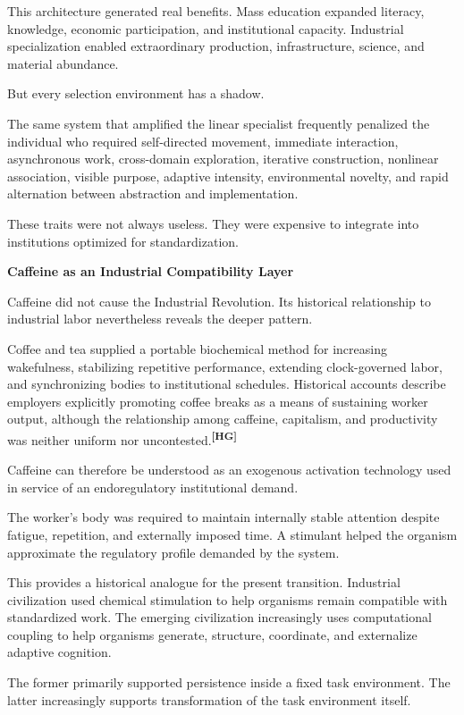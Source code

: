 \documentclass[10pt]{article}
\newcommand{\ActiveAccent}{Industrial}
\newcommand{\papersection}[2]{%
  \Needspace{8\baselineskip}
  \vspace{1.1em}
  \noindent\begin{minipage}[t]{0.12\textwidth}
    \vspace{1pt}{\sffamily\bfseries\fontsize{17}{17}\selectfont\textcolor{\ActiveAccent}{#1}}
  \end{minipage}%
  \begin{minipage}[t]{0.86\textwidth}
    {\sffamily\bfseries\fontsize{16.2}{19}\selectfont #2}\par
    \vspace{0.35em}{\color{\ActiveAccent}\rule{\linewidth}{1.15pt}}
  \end{minipage}
  \vspace{0.55em}
}
\newcommand{\sourcecue}[1]{\textsuperscript{\sffamily\bfseries\fontsize{6.5}{7}\selectfont\textcolor{\ActiveAccent}{[#1]}}}
\begin{document}
This architecture generated real benefits. Mass education expanded literacy, knowledge, economic participation, and institutional capacity. Industrial specialization enabled extraordinary production, infrastructure, science, and material abundance.

But every selection environment has a shadow.

The same system that amplified the linear specialist frequently penalized the individual who required self-directed movement, immediate interaction, asynchronous work, cross-domain exploration, iterative construction, nonlinear association, visible purpose, adaptive intensity, environmental novelty, and rapid alternation between abstraction and implementation.

These traits were not always useless. They were expensive to integrate into institutions optimized for standardization.

\papersection{IV}{Caffeine as an Industrial Compatibility Layer}

Caffeine did not cause the Industrial Revolution. Its historical relationship to industrial labor nevertheless reveals the deeper pattern.

Coffee and tea supplied a portable biochemical method for increasing wakefulness, stabilizing repetitive performance, extending clock-governed labor, and synchronizing bodies to institutional schedules. Historical accounts describe employers explicitly promoting coffee breaks as a means of sustaining worker output, although the relationship among caffeine, capitalism, and productivity was neither uniform nor uncontested.\sourcecue{HG}

Caffeine can therefore be understood as an exogenous activation technology used in service of an endoregulatory institutional demand.

The worker's body was required to maintain internally stable attention despite fatigue, repetition, and externally imposed time. A stimulant helped the organism approximate the regulatory profile demanded by the system.

This provides a historical analogue for the present transition. Industrial civilization used chemical stimulation to help organisms remain compatible with standardized work. The emerging civilization increasingly uses computational coupling to help organisms generate, structure, coordinate, and externalize adaptive cognition.

The former primarily supported persistence inside a fixed task environment. The latter increasingly supports transformation of the task environment itself.
\end{document}
